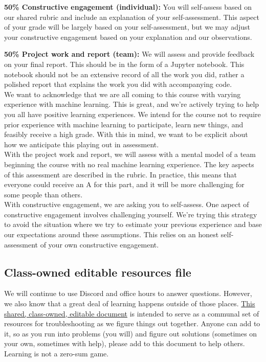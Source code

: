 \documentclass{tufte-handout}
\begin{document}
\vspace{1em}

\textbf{50\% Constructive engagement (individual):} You will self-assess based on our shared rubric and include an explanation of your self-assessment. This aspect of your grade will be largely based on your self-assessment, but we may adjust your constructive engagement based on your explanation and our observations.\\
\vspace{1em}

\textbf{50\% Project work and report (team):}  We will assess and provide feedback on your final report. This should be in the form of a Jupyter notebook. This notebook should not be an extensive record of all the work you did, rather a polished report that explains the work you did with accompanying code. \\

\vspace{1em}
We want to acknowledge that we are all coming to this course with varying experience with machine learning. This is great, and we’re actively trying to help you all have positive learning experiences. We intend for the course not to require prior experience with machine learning to participate, learn new things, and feasibly receive a high grade. With this in mind, we want to be explicit about how we anticipate this playing out in assessment. \\
With the project work and report, we will assess with a mental model of a team beginning the course with no real machine learning experience. The key aspects of this assessment are described in the rubric. In practice, this means that everyone could receive an A for this part, and it will be more challenging for some people than others. \\
With constructive engagement, we are asking you to self-assess. One aspect of constructive engagement involves challenging yourself. 
We’re trying this strategy to avoid the situation where we try to estimate your previous experience and base our expectations around these assumptions. This relies on an honest self-assessment of your own constructive engagement. 

\subsection{Class-owned editable resources file}

We will continue to use Discord and office hours to answer questions. However, we also know that a great deal of learning happens outside of those places.  \href{https://docs.google.com/document/d/14C1dtiLiPF2cAy3alt4PLl0UhkuxPrDZsHgeq-pjwAU/edit?usp=sharing}{This shared, class-owned, editable document} is intended to serve as a communal set of resources for troubleshooting as we figure things out together. Anyone can add to it, so as you run into problems (you will) and figure out solutions (sometimes on your own, sometimes with help), please add to this document to help others. Learning is not a zero-sum game.
\end{document}
